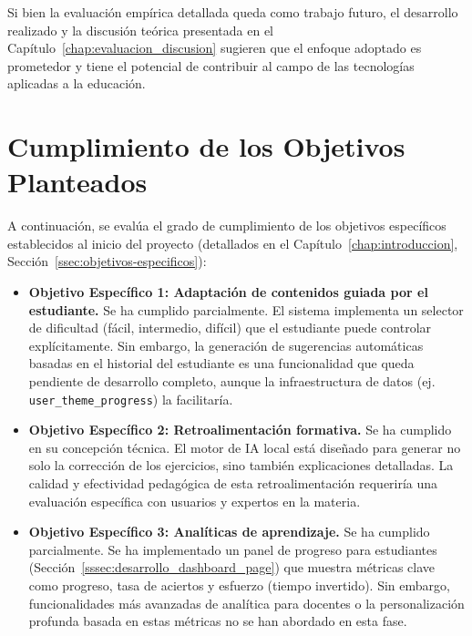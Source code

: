Si bien la evaluación empírica detallada queda como trabajo futuro, el desarrollo realizado y la discusión teórica presentada en el Capítulo~\ref{chap:evaluacion_discusion} sugieren que el enfoque adoptado es prometedor y tiene el potencial de contribuir al campo de las tecnologías aplicadas a la educación.

\section{Cumplimiento de los Objetivos Planteados}
\label{sec:conclusiones_cumplimiento_objetivos}

A continuación, se evalúa el grado de cumplimiento de los objetivos específicos establecidos al inicio del proyecto (detallados en el Capítulo~\ref{chap:introduccion}, Sección~\ref{ssec:objetivos-especificos}):

\begin{itemize}
    \item \textbf{Objetivo Específico 1: Adaptación de contenidos guiada por el estudiante.}
    Se ha cumplido parcialmente. El sistema implementa un selector de dificultad (fácil, intermedio, difícil) que el estudiante puede controlar explícitamente. Sin embargo, la generación de sugerencias automáticas basadas en el historial del estudiante es una funcionalidad que queda pendiente de desarrollo completo, aunque la infraestructura de datos (ej. \texttt{user\_theme\_progress}) la facilitaría.

    \item \textbf{Objetivo Específico 2: Retroalimentación formativa.}
    Se ha cumplido en su concepción técnica. El motor de IA local está diseñado para generar no solo la corrección de los ejercicios, sino también explicaciones detalladas. La calidad y efectividad pedagógica de esta retroalimentación requeriría una evaluación específica con usuarios y expertos en la materia.

    \item \textbf{Objetivo Específico 3: Analíticas de aprendizaje.}
    Se ha cumplido parcialmente. Se ha implementado un panel de progreso para estudiantes (Sección~\ref{sssec:desarrollo_dashboard_page}) que muestra métricas clave como progreso, tasa de aciertos y esfuerzo (tiempo invertido). Sin embargo, funcionalidades más avanzadas de analítica para docentes o la personalización profunda basada en estas métricas no se han abordado en esta fase.
    
\end{itemize}

